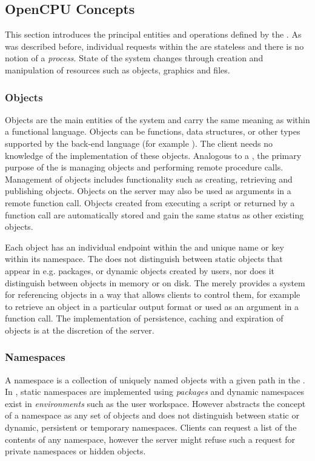 \subsection{OpenCPU Concepts}

This section introduces the principal entities and operations defined by the \API. As was described before, individual requests within the \OpenCPU \API are stateless and there is no notion of a \emph{process}. State of the system changes through creation and manipulation of resources such as objects, graphics and files. 

\subsubsection{Objects}

Objects are the main entities of the system and carry the same meaning as within a functional language. Objects can be functions, data structures, or other types supported by the back-end language (for example \R). The client needs no knowledge of the implementation of these objects. Analogous to a \CLI, the primary purpose of the \API is managing objects and performing remote procedure calls. Management of objects includes functionality such as creating, retrieving and publishing objects. Objects on the server may also be used as arguments in a remote function call. Objects created from executing a script or returned by a function call are automatically stored and gain the same status as other existing objects.

Each object has an individual endpoint within the \API and unique name or key within its namespace. The \API does not distinguish between static objects that appear in e.g. packages, or dynamic objects created by users, nor does it distinguish between objects in memory or on disk. The \API merely provides a system for referencing objects in a way that allows clients to control them, for example to retrieve an object in a particular output format or used as an argument in a function call. The implementation of persistence, caching and expiration of objects is at the discretion of the server. 

\subsubsection{Namespaces}

A namespace is a collection of uniquely named objects with a given path in the \API. In \R, static namespaces are implemented using \emph{packages} and dynamic namespaces exist in \emph{environments} such as the user workspace. However \OpenCPU abstracts the concept of a namespace as any set of objects and does not distinguish between static or dynamic, persistent or temporary namespaces. Clients can request a list of the contents of any namespace, however the server might refuse such a request for private namespaces or hidden objects. 

